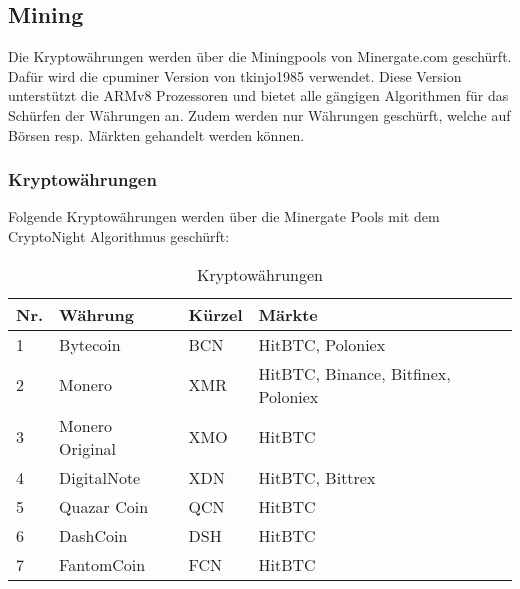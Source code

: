 \subsection{Mining}
Die Kryptowährungen werden über die Miningpools von Minergate.com geschürft. Dafür wird die cpuminer Version von tkinjo1985 verwendet. Diese Version unterstützt die ARMv8 Prozessoren und bietet alle gängigen Algorithmen für das Schürfen der Währungen an.
Zudem werden nur Währungen geschürft, welche auf Börsen resp. Märkten gehandelt werden können.


\subsubsection{Kryptowährungen}
Folgende Kryptowährungen werden über die Minergate Pools mit dem CryptoNight Algorithmus geschürft:

\begin{table}[H]
\centering
\begin{tabular}{p{1cm}p{3.5cm}p{2cm}p{9.5cm}}
\hline
\rowcolor{heading} \textbf{Nr.} & \textbf{Währung} & \textbf{Kürzel} &\textbf{Märkte } \\\hline
1 & Bytecoin & BCN & HitBTC, Poloniex \\\hline
2 & Monero & XMR & HitBTC, Binance, Bitfinex, Poloniex \\\hline
3 & Monero Original & XMO & HitBTC \\\hline
4 & DigitalNote & XDN & HitBTC, Bittrex \\\hline
5 & Quazar Coin & QCN & HitBTC \\\hline
6 & DashCoin & DSH & HitBTC \\\hline
7 & FantomCoin & FCN & HitBTC \\\hline
\end{tabular}
\caption{Kryptowährungen}
\end{table}


